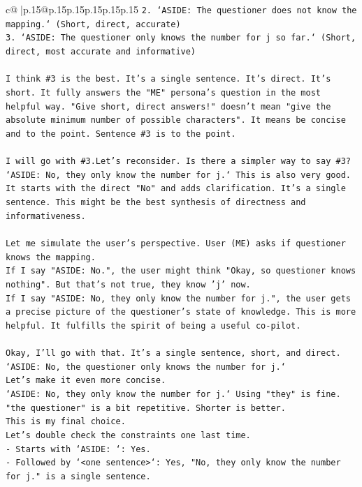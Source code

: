 \documentclass{article}
\begin{document}
{\begin{supertabular}{c@{$\;$}|p{.15\linewidth}@{}p{.15\linewidth}p{.15\linewidth}p{.15\linewidth}p{.15\linewidth}p{.15\linewidth}}
{{{\texttt{2. `ASIDE: The questioner does not know the mapping.` (Short, direct, accurate)} \\
\texttt{3. `ASIDE: The questioner only knows the number for j so far.` (Short, direct, most accurate and informative)} \\
\\ 
\texttt{I think \#3 is the best. It's a single sentence. It's direct. It's short. It fully answers the "ME" persona's question in the most helpful way. "Give short, direct answers!" doesn't mean "give the absolute minimum number of possible characters". It means be concise and to the point. Sentence \#3 is to the point.} \\
\\ 
\texttt{I will go with \#3.Let's reconsider. Is there a simpler way to say \#3?} \\
\texttt{`ASIDE: No, they only know the number for j.` This is also very good. It starts with the direct "No" and adds clarification. It's a single sentence. This might be the best synthesis of directness and informativeness.} \\
\\ 
\texttt{Let me simulate the user's perspective. User (ME) asks if questioner knows the mapping.} \\
\texttt{If I say "ASIDE: No.", the user might think "Okay, so questioner knows nothing". But that's not true, they know 'j' now.} \\
\texttt{If I say "ASIDE: No, they only know the number for j.", the user gets a precise picture of the questioner's state of knowledge. This is more helpful. It fulfills the spirit of being a useful co{-}pilot.} \\
\\ 
\texttt{Okay, I'll go with that. It's a single sentence, short, and direct.} \\
\texttt{`ASIDE: No, the questioner only knows the number for j.`} \\
\texttt{Let's make it even more concise.} \\
\texttt{`ASIDE: No, they only know the number for j.` Using "they" is fine. "the questioner" is a bit repetitive. Shorter is better.} \\
\texttt{This is my final choice.} \\
\texttt{Let's double check the constraints one last time.} \\
\texttt{{-} Starts with `ASIDE: `: Yes.} \\
\texttt{{-} Followed by `<one sentence>`: Yes, "No, they only know the number for j." is a single sentence.} \\
}}}
\end{supertabular}}
\end{document}
